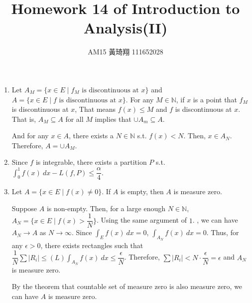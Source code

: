 \documentclass[12pt]{article}
\title{Homework 14 of Introduction to Analysis(II)}
\author{AM15 黃琦翔 111652028}
\begin{document}
\maketitle
\begin{enumerate}
    \item Let $A_M = \{x \in E \mid f_M\text{ is discontinuous at } x\}$ and $A = \{ x\in E \mid f\text{ is discontinuous at } x\}$.
    For any $M \in \mathbb{N}$, if $x$ is a point that $f_M$ is discontinuous at $x$, 
    That means $f(x) \leq M$ and $f$ is discontinuous at $x$.
    That is, $A_M \subseteq A$ for all $M$ implies that $\cup A_m \subseteq A$.

    And for any $x \in A$, there exists a $N \in \mathbb{N}$ s.t. $f(x) < N$.
    Then, $x \in A_N$.
    Therefore, $A = \cup A_M$.

    \item Since $f$ is integrable, there exists a partition $P$ s.t. $\displaystyle\int_{0}^{1} f(x)\ dx - L(f, P) \leq \dfrac{\alpha}{4}$.



    \item Let $A = \{x \in E\mid f(x)\neq 0\}$. If $A$ is empty, then $A$ is measure zero.
    
    Suppose $A$ is non-empty.
    Then, for a large enough $N\in \mathbb{N}$, $A_N = \{x\in E\mid f(x) > \dfrac{1}{N}\}$.
    Using the same argument of $1$. , we can have $A_N \to A$ as $N \to \infty$.
    Since $\displaystyle\int_{E} f(x)\ dx = 0$, $\displaystyle\int_{A_N} f(x)\ dx = 0$.
    Thus, for any $\epsilon > 0$, there exists rectangles such that $\dfrac{1}{N}\sum |R_i| \leq (L)\displaystyle\int_{A_N} f(x)\ dx \leq \dfrac{\epsilon}{N}$.
    Therefore, $\sum |R_i| < N \cdot \dfrac{\epsilon}{N} = \epsilon$ and $A_N$ is measure zero.
    
    By the theorem that countable set of measure zero is also measure zero, we can have $A$ is measure zero.
\end{enumerate}
\end{document}
